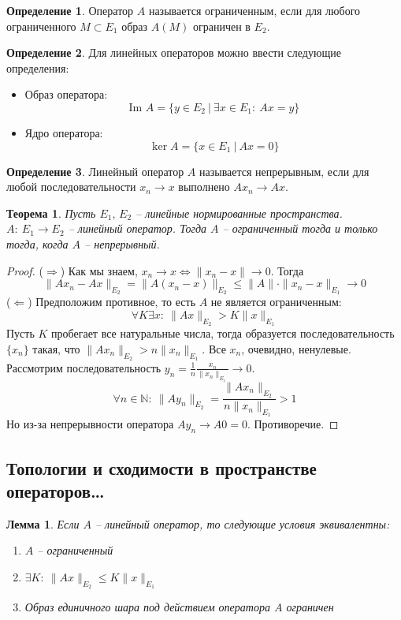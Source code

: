 \documentclass[a4paper,12pt]{article}
\renewcommand{\leq}{\ensuremath{\leqslant}}
\theoremstyle{plain}
\newtheorem{theorem}{Теорема}[section]
\newtheorem{lemma}{Лемма}[section]
\theoremstyle{definition}
\newtheorem{definition}{Определение}[section]
\theoremstyle{remark}
\begin{document}
\begin{definition}
	Оператор $A$ называется ограниченным, если для любого ограниченного $M \subset E_1$ образ $A(M)$ ограничен в $E_2$.
\end{definition}

\begin{definition}
	Для линейных операторов можно ввести следующие определения:
	\begin{itemize}
		\item Образ оператора:
		      \[
			      \text{Im } A = \{y \in E_2 \:\vert\: \exists x \in E_1 :\: Ax = y\}
		      \]
		\item Ядро оператора:
		      \[
			      \ker A = \{x \in E_1 \:\vert\: Ax = 0\}
		      \]
	\end{itemize}
\end{definition}

\begin{definition}
	Линейный оператор $A$ называется непрерывным, если для любой последовательности $x_n \to x$ выполнено $Ax_n \to Ax$.
\end{definition}

\begin{theorem}
	Пусть $E_1,\,E_2$ -- линейные нормированные пространства. $A :\: E_1 \to E_2$ -- линейный оператор. Тогда $A$ -- ограниченный тогда и только тогда, когда $A$ -- непрерывный.
\end{theorem}

\begin{proof}
	($\Rightarrow$) Как мы знаем, $x_n \to x \Leftrightarrow \|x_n - x\| \to 0$. Тогда
	\[
		\|Ax_n - Ax\|_{E_2} = \|A(x_n - x)\|_{E_2} \leq \|A\| \cdot\|x_n - x\|_{E_1} \to 0
	\]
	($\Leftarrow$) Предположим противное, то есть $A$ не является ограниченным:
	\[
		\forall K \exists x :\: \|Ax\|_{E_2} > K\|x\|_{E_1}
	\]
	Пусть $K$ пробегает все натуральные числа, тогда образуется последовательность $\{x_n\}$ такая, что $\|Ax_n\|_{E_2} > n\|x_n\|_{E_1}$. Все $x_n$, очевидно, ненулевые. Рассмотрим последовательность $y_n = \frac{1}{n}\frac{x_n}{\|x_n\|_{E_1}} \to 0$.
	\[
		\forall n \in \mathbb{N} :\: \|Ay_n\|_{E_2} = \frac{\|Ax_n\|_{E_2}}{n\|x_n\|_{E_1}} > 1
	\]
	Но из-за непрерывности оператора $Ay_n \to A0 = 0$. Противоречие.
\end{proof}

\subsection{Топологии и сходимости в пространстве операторов\dots}
\begin{lemma}
	Если $A$ -- линейный оператор, то следующие условия эквивалентны:
	\begin{enumerate}
		\item $A$ -- ограниченный
		\item $\exists K :\: \|Ax\|_{E_2} \leq K\|x\|_{E_1}$
		\item Образ единичного шара под действием оператора $A$ ограничен
	\end{enumerate}
\end{lemma}
\end{document}
